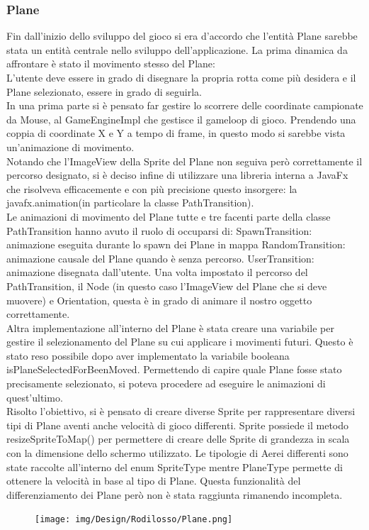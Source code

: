 \documentclass[a4paper,12pt]{report}
\begin{document}
\subsubsection{Plane}
Fin dall’inizio dello sviluppo del gioco si era d’accordo che l’entità Plane sarebbe stata un entità centrale nello sviluppo dell’applicazione.
La prima dinamica da affrontare è stato il movimento stesso del Plane:
\\
L’utente deve essere in grado di disegnare la propria rotta come più desidera e il Plane selezionato, essere in grado di seguirla.
\\
In una prima parte si è pensato far gestire lo scorrere delle coordinate campionate da Mouse, al GameEngineImpl che gestisce il gameloop
di gioco.
Prendendo una coppia di coordinate X e Y a tempo di frame, in questo modo si sarebbe vista un’animazione di movimento.
\\
Notando che l’ImageView della Sprite del Plane non seguiva però correttamente il percorso designato, si è deciso infine di utilizzare una 
libreria interna a JavaFx che risolveva efficacemente e con più precisione questo insorgere: la javafx.animation(in particolare la classe 
PathTransition).
\\
Le animazioni di movimento del Plane tutte e tre facenti parte della classe PathTransition hanno avuto il ruolo di occuparsi di:
	SpawnTransition: animazione eseguita durante lo spawn dei Plane in mappa
	RandomTransition: animazione causale del Plane quando è senza percorso.
	UserTransition: animazione disegnata dall’utente.
Una volta impostato il percorso del PathTransition, il Node (in questo caso l’ImageView del Plane che si deve muovere) e Orientation, questa 
è in grado di animare il nostro oggetto correttamente.
\\
Altra implementazione all’interno del Plane è stata creare una variabile per gestire il selezionamento del Plane su cui applicare i movimenti 
futuri.
Questo è stato reso possibile dopo aver implementato la variabile booleana isPlaneSelectedForBeenMoved.
Permettendo di capire quale Plane fosse stato precisamente selezionato, si poteva procedere ad eseguire le animazioni di quest’ultimo.
\\
Risolto l’obiettivo, si è pensato di creare diverse Sprite per rappresentare diversi tipi di Plane aventi anche velocità di gioco differenti.
Sprite possiede il metodo resizeSpriteToMap() per permettere di creare delle Sprite di grandezza in scala con la dimensione dello schermo 
utilizzato.
Le tipologie di Aerei differenti sono state raccolte all’interno del enum SpriteType mentre PlaneType permette di ottenere la velocità in 
base al tipo di Plane.
Questa funzionalità del differenziamento dei Plane però non è stata raggiunta rimanendo incompleta.
\begin{figure}[H]
    \begin{center}
        \centering
        \texttt{[image: img/Design/Rodilosso/Plane.png]}
    \end{center}
    \label{img:planeuml}
\end{figure}
\end{document}
